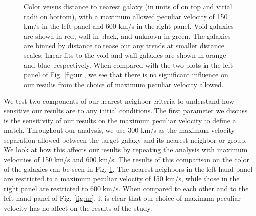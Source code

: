 \begin{figure}
    \caption[Sensitivity to peculiar velocity maximum]{Color versus distance to 
    nearest galaxy (in units of \hMpc on top and virial radii on bottom), with a 
    maximum allowed peculiar velocity of 150 km/s in the left panel and 600 km/s 
    in the right panel.  Void galaxies are shown in red, wall in black, and 
    unknown in green.  The galaxies are binned by distance to tease out any 
    trends at smaller distance scales; linear fits to the void and wall galaxies 
    are shown in orange and blue, respectively.  When compared with the two 
    plots in the left panel of Fig. \ref{fig:ur}, we see that there is no 
    significant influence on our results from the choice of maximum peculiar 
    velocity allowed.}
    \label{fig:ur_vpeculiar}
\end{figure}

We test two components of our nearest neighbor criteria to understand how 
sensitive our results are to any initial conditions.  The first parameter we 
discuss is the sensitivity of our results on the maximum peculiar velocity to 
define a match.  Throughout our analysis, we use 300 km/s as the maximum 
velocity separation allowed between the target galaxy and its nearest neighbor 
or group.  We look at how this affects our results by repeating the analysis 
with maximum velocities of 150 km/s and 600 km/s.  The results of this 
comparison on the color of the galaxies can be seen in Fig. 
\ref{fig:ur_vpeculiar}.  The nearest neighbors in the left-hand panel are 
restricted to a maximum peculiar velocity of 150 km/s, while those in the right 
panel are restricted to 600 km/s.  When compared to each other and to the 
left-hand panel of Fig. \ref{fig:ur}, it is clear that our choice of maximum 
peculiar velocity has no affect on the results of the study.


